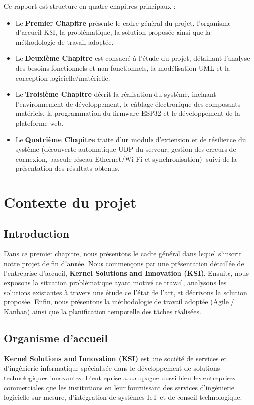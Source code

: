 \documentclass[12pt,a4paper]{report}
\begin{document}
\vspace{0.3cm}
Ce rapport est structuré en quatre chapitres principaux :
\begin{itemize}
    \item Le \textbf{Premier Chapitre} présente le cadre général du projet, l'organisme d'accueil KSI, la problématique, la solution proposée ainsi que la méthodologie de travail adoptée.
    \item Le \textbf{Deuxième Chapitre} est consacré à l'étude du projet, détaillant l'analyse des besoins fonctionnels et non-fonctionnels, la modélisation UML et la conception logicielle/matérielle.
    \item Le \textbf{Troisième Chapitre} décrit la réalisation du système, incluant l'environnement de développement, le câblage électronique des composants matériels, la programmation du firmware ESP32 et le développement de la plateforme web.
    \item Le \textbf{Quatrième Chapitre} traite d'un module d'extension et de résilience du système (découverte automatique UDP du serveur, gestion des erreurs de connexion, bascule réseau Ethernet/Wi-Fi et synchronisation), suivi de la présentation des résultats obtenus.
\end{itemize}

\newpage

\chapter{Contexte du projet}

\section{Introduction}
Dans ce premier chapitre, nous présentons le cadre général dans lequel s'inscrit notre projet de fin d'année. Nous commençons par une présentation détaillée de l'entreprise d'accueil, \textbf{Kernel Solutions and Innovation (KSI)}. Ensuite, nous exposons la situation problématique ayant motivé ce travail, analysons les solutions existantes à travers une étude de l'état de l'art, et décrivons la solution proposée. Enfin, nous présentons la méthodologie de travail adoptée (Agile / Kanban) ainsi que la planification temporelle des tâches réalisées.

\section{Organisme d'accueil}
\textbf{Kernel Solutions and Innovation (KSI)} est une société de services et d'ingénierie informatique spécialisée dans le développement de solutions technologiques innovantes. L'entreprise accompagne aussi bien les entreprises commerciales que les institutions en leur fournissant des services d'ingénierie logicielle sur mesure, d'intégration de systèmes IoT et de conseil technologique.
\end{document}
